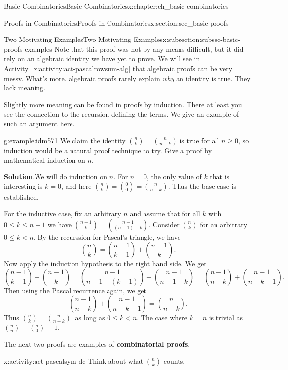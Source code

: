 \documentclass[oneside,10pt,]{book}
\newcommand{\terminology}[1]{\textbf{#1}}
\numberwithin{equation}{chapter}
\newcommand{\lt}{<}
\begin{document}
\begin{chapterptx}{Basic Combinatorics}{}{Basic Combinatorics}{}{}{x:chapter:ch_basic-combinatorics}
\begin{sectionptx}{Proofs in Combinatorics}{}{Proofs in Combinatorics}{}{}{x:section:sec_basic-proofs}
\begin{subsectionptx}{Two Motivating Examples}{}{Two Motivating Examples}{}{}{x:subsection:subsec-basic-proofs-examples}
Note that this proof was not by any means difficult, but it did rely on an algebraic identity we have yet to prove.  We will see in \hyperref[x:activity:act-pascalrowsum-alg]{Activity~\ref{x:activity:act-pascalrowsum-alg}} that algebraic proofs can be very messy.  What's more, algebraic proofs rarely explain \emph{why} an identity is true.  They lack meaning.%
\par
Slightly more meaning can be found in proofs by induction.  There at least you see the connection to the recursion defining the terms.  We give an example of such an argument here.%
\begin{example}{}{g:example:idm571}%
We claim the identity \(\binom{n}{k} = \binom{n}{n-k}\) is true for all \(n \ge 0\), so induction would be a natural proof technique to try.  Give a proof by mathematical induction on \(n\).%
\par\smallskip%
\noindent\textbf{Solution}.\hypertarget{g:solution:idm577}{}\quad{}We will do induction on \(n\).  For \(n = 0\), the only value of \(k\) that is interesting is \(k=0\), and here \(\binom{n}{k} = \binom{0}{0} = \binom{n}{n-k}\).  Thus the base case is established.%
\par
For the inductive case, fix an arbitrary \(n\) and assume that for all \(k\) with \(0 \le k \le n-1\) we have \(\binom{n-1}{k} = \binom{n-1}{(n-1)-k}\).  Consider \(\binom{n}{k}\) for an arbitrary \(0 \le k \lt n\).  By the recurssion for Pascal's triangle, we have%
\begin{equation*}
\binom{n}{k} = \binom{n-1}{k-1} + \binom{n-1}{k}.
\end{equation*}
Now apply the induction hypothesis to the right hand side.  We get%
\begin{equation*}
\binom{n-1}{k-1} + \binom{n-1}{k} = \binom{n-1}{n-1-(k-1)} + \binom{n-1}{n-1 -k} = \binom{n-1}{n-k} + \binom{n-1}{n-k-1}.
\end{equation*}
Then using the Pascal recurrence again, we get%
\begin{equation*}
\binom{n-1}{n-k} + \binom{n-1}{n-k-1} = \binom{n}{n-k}.
\end{equation*}
Thus \(\binom{n}{k} = \binom{n}{n-k}\), as long as \(0 \le k \lt n\).  The case where \(k = n\) is trivial as \(\binom{n}{n} = \binom{n}{0} = 1\).%
\end{example}
The next two proofs are examples of \terminology{combinatorial proofs}.%
\begin{activity}{}{x:activity:act-pascalsym-dc}%
Think about what \(\binom{n}{k}\) counts.%
\begin{enumerate}[font=\bfseries,label=(\alph*),ref=\alph*]

\end{enumerate}
\end{activity}
\end{subsectionptx}
\end{sectionptx}
\end{chapterptx}
\end{document}
